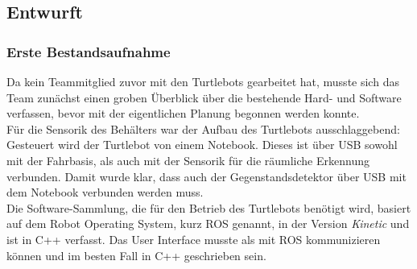 \documentclass[a4paper,12pt,headsepline]{scrartcl}
\begin{document}
\subsection{Entwurft}
\subsubsection{Erste Bestandsaufnahme}
Da kein Teammitglied zuvor mit den Turtlebots gearbeitet hat, musste sich das Team zunächst einen groben Überblick über die bestehende Hard- und Software verfassen, bevor mit der eigentlichen Planung begonnen werden konnte.\\
Für die Sensorik des Behälters war der Aufbau des Turtlebots ausschlaggebend: Gesteuert wird der Turtlebot von einem Notebook. Dieses ist über USB sowohl mit der Fahrbasis, als auch mit der Sensorik für die räumliche Erkennung verbunden. Damit wurde klar, dass auch der Gegenstandsdetektor über USB mit dem Notebook verbunden werden muss. \\
Die Software-Sammlung, die für den Betrieb des Turtlebots benötigt wird, basiert auf dem \glqq Robot Operating System\grqq , kurz ROS genannt, in der Version \textit{Kinetic} und ist in C++ verfasst. Das User Interface musste als mit ROS kommunizieren können und im besten Fall in C++ geschrieben sein.
\end{document}
